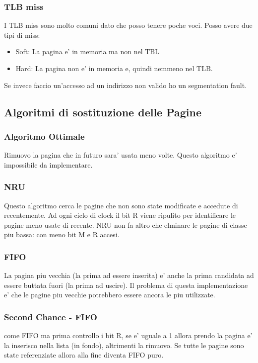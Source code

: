     \subsubsection{TLB miss}
        I TLB miss sono molto comuni dato che posso tenere poche voci. Posso avere due tipi di miss:
        \begin{itemize}
            \item Soft: La pagina e' in memoria ma non nel TBL
            \item Hard: La pagina non e' in memoria e, quindi nemmeno nel TLB.
        \end{itemize}

        Se invece faccio un'accesso ad un indirizzo non valido ho un segmentation fault.
\subsection{Algoritmi di sostituzione delle Pagine}
    \subsubsection{Algoritmo Ottimale}
        Rimuovo la pagina che in futuro sara' usata meno volte. Questo algoritmo e' impossibile da implementare.
    \subsubsection{NRU}
        Questo algoritmo cerca le pagine che non sono state modificate e accedute di recentemente.
        Ad ogni ciclo di clock il bit R viene ripulito per identificare le pagine meno usate di recente.
        NRU non fa altro che elminare le pagine di classe piu bassa: con meno bit M e R accesi.
    \subsubsection{FIFO}
        La pagina piu vecchia (la prima ad essere inserita) e' anche la prima candidata ad essere buttata
        fuori  (la prima ad uscire). Il problema di questa implementazione e' che le pagine piu vecchie potrebbero essere
        ancora le piu utilizzate.
    \subsubsection{Second Chance - FIFO}
        come FIFO ma prima controllo i bit R, se e' uguale a 1 allora prendo la pagina e' la inserisco nella lista (in fondo), 
        altrimenti la rimuovo.
        Se tutte le pagine sono state referenziate allora alla fine diventa FIFO puro.
